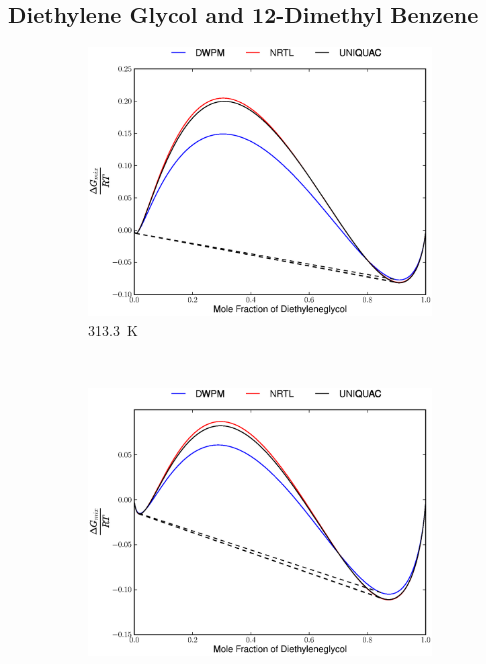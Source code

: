 \subsection{Diethylene Glycol and 12-Dimethyl Benzene}
\vspace*{\fill}
\begin{figure}[hp]
\begin{subfigure}[h]{0.5\textwidth}
	\centering
	\includegraphics[width = \textwidth]{Results_Parts/BinaryParams/diethyleneglycol-12-dimethylbenzene/AllModelsGibbsPlots/T_313.3.eps}
	\caption{313.3~$\mathrm{K}$} 
\end{subfigure}%
~%
\begin{subfigure}[h]{0.5\textwidth}
	\centering
	\includegraphics[width = \textwidth]{Results_Parts/BinaryParams/diethyleneglycol-12-dimethylbenzene/AllModelsGibbsPlots/T_332.8.eps}

\end{subfigure}
\end{figure}
